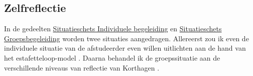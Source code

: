 




\subsection{Zelfreflectie}
In de gedeelten \hyperref[sec:groep]{Situatieschets Individuele begeleiding} en \hyperref[sec:individu]{Situatieschets Groepsbegeleiding} worden twee situaties aangedragen. Allereerst zou ik even de individuele situatie van de afstudeerder even willen uitlichten aan de hand van het estafetteloop-model \cite{methorstkaders}. Daarna behandel ik de groepssituatie aan de verschillende niveaus van reflectie van Korthagen \cite{korthagen2002niveaus}.

